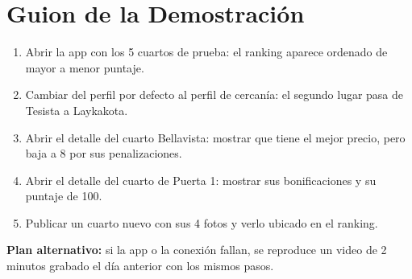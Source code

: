 \documentclass[11pt,a4paper]{article}
\begin{document}
\section{Guion de la Demostración}
\begin{enumerate}[leftmargin=*]
    \item Abrir la app con los 5 cuartos de prueba: el ranking aparece ordenado de mayor a menor puntaje.
    \item Cambiar del perfil por defecto al perfil de cercanía: el segundo lugar pasa de Tesista a Laykakota.
    \item Abrir el detalle del cuarto Bellavista: mostrar que tiene el mejor precio, pero baja a 8 por sus penalizaciones.
    \item Abrir el detalle del cuarto de Puerta 1: mostrar sus bonificaciones y su puntaje de 100.
    \item Publicar un cuarto nuevo con sus 4 fotos y verlo ubicado en el ranking.
\end{enumerate}
\noindent\textbf{Plan alternativo:} si la app o la conexión fallan, se reproduce un video de 2 minutos grabado el día anterior con los mismos pasos.

\end{document}
